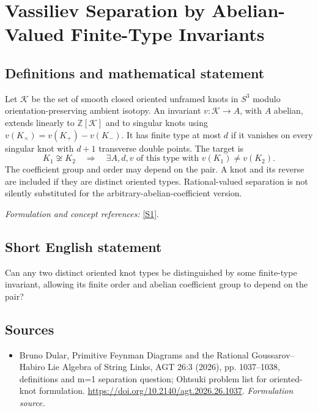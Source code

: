 \documentclass[11pt]{article}
\begin{document}
\section*{\texorpdfstring{Vassiliev Separation by Abelian-Valued Finite-Type Invariants}{Vassiliev Separation by Abelian-Valued Finite-Type Invariants}}\label{statement}
\subsection{Definitions and mathematical statement}
Let $\mathcal K$ be the set of smooth closed oriented unframed knots in $S^3$ modulo orientation-preserving ambient isotopy. An invariant $v:\mathcal K\to A$, with $A$ abelian, extends linearly to ${\mathbb{Z}}[\mathcal K]$ and to singular knots using
$v(K_\times)=v(K_+)-v(K_-)$. It has finite type at most $d$ if it vanishes on every singular knot with $d+1$ transverse double points. The target is
\[
 K_1\not\cong K_2\quad\Longrightarrow\quad
 \exists A,d,v\text{ of this type with }v(K_1)\ne v(K_2).
\]
The coefficient group and order may depend on the pair. A knot and its reverse are included if they are distinct oriented types. Rational-valued separation is not silently substituted for the arbitrary-abelian-coefficient version.
\par\smallskip\textit{Formulation and concept references:} \href{https://doi.org/10.2140/agt.2026.26.1037}{[S1]}.

\subsection{Short English statement}
Can any two distinct oriented knot types be distinguished by some finite-type invariant, allowing its finite order and abelian coefficient group to depend on the pair?
\subsection{Sources}
\begin{itemize}
\item[S1]Bruno Dular, Primitive Feynman Diagrams and the Rational Goussarov–Habiro Lie Algebra of String Links, AGT 26:3 (2026), pp. 1037–1038, definitions and m=1 separation question; Ohtsuki problem list for oriented-knot formulation.
\url{https://doi.org/10.2140/agt.2026.26.1037}.
\textit{Formulation source.}
\end{itemize}
\end{document}
